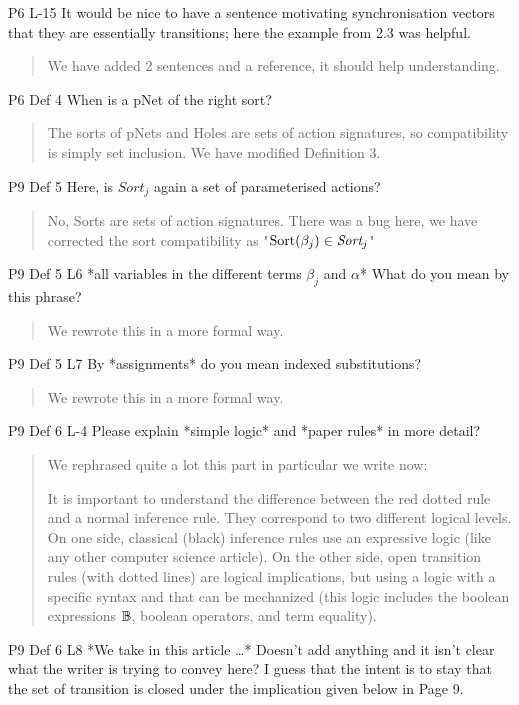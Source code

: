 \documentclass{article}
\begin{document}
P6 L-15 It would be nice to have a sentence motivating synchronisation vectors that they are essentially transitions; here the example from 2.3 was helpful.
\begin{quote}
We have added 2 sentences and a reference, it should help understanding. 
\end{quote}

P6 Def 4 When is a pNet of the right sort?
\begin{quote}
The sorts of pNets and Holes are sets of action signatures, so compatibility is simply set inclusion. We have modified Definition 3.
\end{quote}

P9 Def 5 Here, is $Sort_j$ again a set of parameterised actions?
\begin{quote}
No, Sorts are sets of action signatures. There was a bug here, we have corrected the sort compatibility as "$\Sortop(\beta_j)\in\Sort_j$"
\end{quote}

P9 Def 5 L6 *all variables in the different terms $\beta_j$ and $\alpha$* What do you mean by this phrase?
\begin{quote}
We rewrote this in a more formal way.
\end{quote}

P9 Def 5 L7 By *assignments* do you mean indexed substitutions?
\begin{quote}
We rewrote this in a more formal way.
\end{quote}

P9 Def 6 L-4 Please explain *simple logic* and *paper rules* in more detail?

\begin{quote}
We rephrased quite a lot this part in particular we write now:

It is important to understand the difference between the red dotted rule and a normal 
inference rule. They correspond to two different logical levels.
On one side, classical (black) inference rules  use  an expressive logic (like any other computer science article).
 On the other side, open transition rules (with dotted lines) are logical implications, but using a  logic with a specific syntax and that can be mechanized (this logic includes the boolean expressions $\mathbb{B}$, boolean operators, and term equality).
\end{quote}

P9 Def 6 L8 *We take in this article …* Doesn’t add anything and it isn’t clear what the writer is trying to convey here? I guess that the intent is to stay that the set of transition is closed under the implication given below in Page 9.
\end{document}
